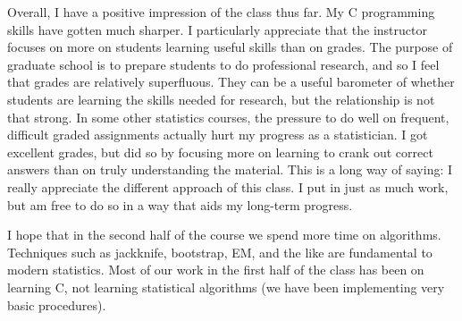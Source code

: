 \documentclass{report}
\begin{document}
Overall, I have a positive impression of the class thus far. My C programming
skills have gotten much sharper. I particularly appreciate that the instructor
focuses on more on students learning useful skills than on grades. The purpose of
graduate school is to prepare students to do professional research, and so 
I feel that grades are relatively superfluous. They can be a useful
barometer of whether students are learning the skills needed for research, but the
relationship is not that strong. In some other statistics courses, the pressure 
to do well on frequent, difficult graded assignments actually hurt my
progress as a statistician. I got excellent grades, but did so by focusing more on 
learning to crank out correct answers than on truly understanding the material.
This is a long way of saying: I really appreciate the different approach of this
class. I put in just as much work, but am free to do so in a way that aids my
long-term progress. 

I hope that in the second half of the course we spend more time on algorithms.
Techniques such as jackknife, bootstrap, EM, and the like are fundamental to
modern statistics. Most of our work in the first half of the class has been on
learning C, not learning statistical algorithms (we have been implementing very
basic procedures). 
\end{document}
